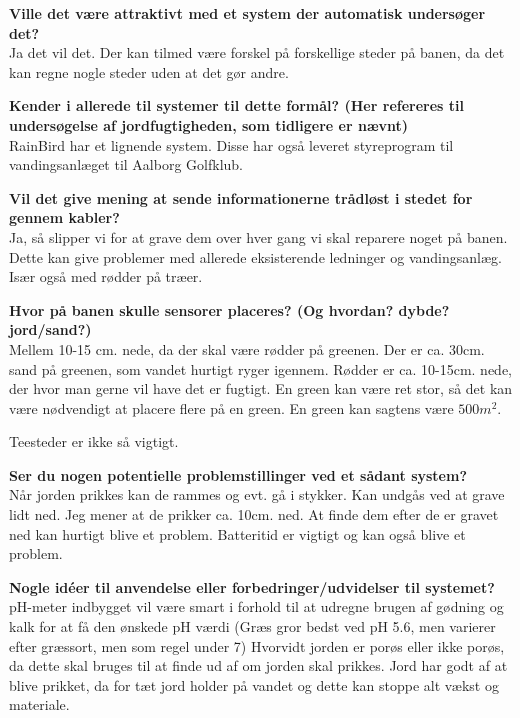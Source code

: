 \textbf{Ville det være attraktivt med et system der automatisk undersøger det?}\\
Ja det vil det. Der kan tilmed være forskel på forskellige steder på banen, da det kan regne nogle steder uden at det gør andre.

\textbf{Kender i allerede til systemer til dette formål? (Her refereres til undersøgelse af jordfugtigheden, som tidligere er nævnt)}\\
RainBird har et lignende system. Disse har også leveret styreprogram til vandingsanlæget til Aalborg Golfklub.

\textbf{Vil det give mening at sende informationerne trådløst i stedet for gennem kabler?}\\
Ja, så slipper vi for at grave dem over hver gang vi skal reparere noget på banen. Dette kan give problemer med allerede eksisterende ledninger og vandingsanlæg. Især også med rødder på træer.

\textbf{Hvor på banen skulle sensorer placeres? (Og hvordan? dybde? jord/sand?)}\\
Mellem 10-15 cm. nede, da der skal være rødder på greenen. Der er ca. 30cm. sand på greenen, som vandet hurtigt ryger igennem. Rødder er ca. 10-15cm. nede, der hvor man gerne vil have det er fugtigt.
En green kan være ret stor, så det kan være nødvendigt at placere flere på en green. En green kan sagtens være $500m^2$.

Teesteder er ikke så vigtigt.

\textbf{Ser du nogen potentielle problemstillinger ved et sådant system?}\\
Når jorden prikkes kan de rammes og evt. gå i stykker. Kan undgås ved at grave lidt ned. Jeg mener at de prikker ca. 10cm. ned. 
At finde dem efter de er gravet ned kan hurtigt blive et problem. Batteritid er vigtigt og kan også blive et problem.

\textbf{Nogle idéer til anvendelse eller forbedringer/udvidelser til systemet?}\\
pH-meter indbygget vil være smart i forhold til at udregne brugen af gødning og kalk for at få den ønskede pH værdi (Græs gror bedst ved pH 5.6, men varierer efter græssort, men som regel under 7)
Hvorvidt jorden er porøs eller ikke porøs, da dette skal bruges til at finde ud af om jorden skal prikkes.
Jord har godt af at blive prikket, da for tæt jord holder på vandet og dette kan stoppe alt vækst og materiale.
